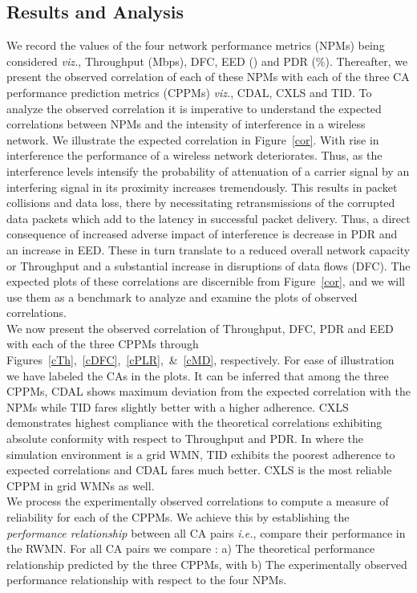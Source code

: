 \documentclass[conference]{IEEEtran}
\begin{document}
 \subsection{Results and Analysis}
We record the values of the four network performance metrics (NPMs) being considered \emph{viz.}, Throughput (Mbps), DFC, EED () and PDR (\%). Thereafter, we present the observed correlation of each of these NPMs with each of the three CA performance prediction metrics (CPPMs) \emph{viz.}, CDAL,  CXLS and TID. To analyze the observed correlation it is imperative to understand the expected correlations between NPMs and the intensity of interference in a wireless network. We illustrate the expected correlation in Figure~\ref{cor}. With rise in interference the performance of a wireless network deteriorates. Thus, as the interference levels intensify the probability of attenuation of a carrier signal by an interfering signal in its proximity increases tremendously. This results in packet collisions and data loss, there by necessitating retransmissions of the corrupted data packets which add to the latency in successful packet delivery. Thus, a direct consequence of increased adverse 
impact of interference is decrease in PDR and an increase in EED. These in turn translate to a reduced overall network capacity or Throughput and a substantial increase in disruptions of data flows (DFC). The expected plots of these correlations are discernible from Figure~\ref{cor}, and we will use them as a benchmark to analyze and examine the plots of observed correlations.\\
We now present the observed correlation of Throughput, DFC, PDR and EED with each of the three CPPMs through Figures~\ref{cTh},~\ref{cDFC},~\ref{cPLR},~\&~\ref{cMD}, respectively. For ease of illustration we have labeled the CAs in the plots.
It can be inferred that among the three CPPMs, CDAL shows maximum deviation from the expected correlation with the NPMs while TID fares slightly better with a higher adherence. CXLS demonstrates highest compliance with the theoretical correlations exhibiting absolute conformity with respect to Throughput and PDR. In \cite{Manas4} where the simulation environment is a  grid WMN, TID exhibits the poorest adherence to expected correlations and CDAL fares much better. CXLS is the most reliable CPPM in grid WMNs as well.\\
We process the experimentally observed correlations to compute a measure of reliability for each of the CPPMs. We achieve this by establishing the \textit{performance relationship} between all CA pairs \emph{i.e.}, compare their performance in the RWMN. For all CA pairs we compare : a) The theoretical performance relationship predicted by the three CPPMs, with b) The experimentally observed performance relationship with respect to the four NPMs.\\
\end{document}
